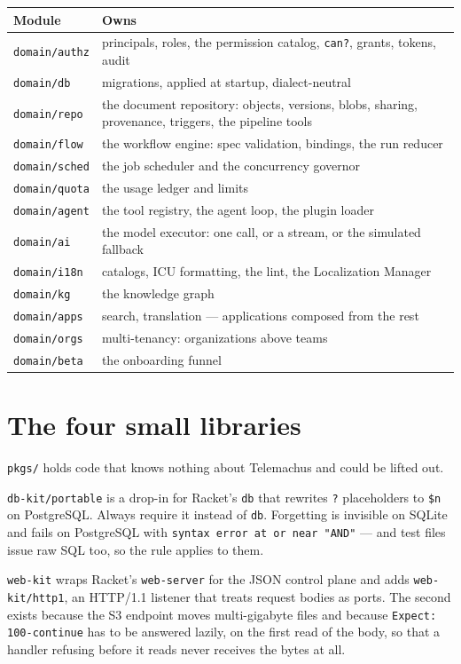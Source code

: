 \documentclass[11pt,a4paper]{report}
\begin{document}
\begin{longtable}{p{3.6cm}p{10.4cm}}
\toprule
Module & Owns \\
\midrule
\texttt{domain/authz} & principals, roles, the permission catalog, \texttt{can?}, grants, tokens, audit \\
\texttt{domain/db} & migrations, applied at startup, dialect-neutral \\
\texttt{domain/repo} & the document repository: objects, versions, blobs, sharing, provenance, triggers, the pipeline tools \\
\texttt{domain/flow} & the workflow engine: spec validation, bindings, the run reducer \\
\texttt{domain/sched} & the job scheduler and the concurrency governor \\
\texttt{domain/quota} & the usage ledger and limits \\
\texttt{domain/agent} & the tool registry, the agent loop, the plugin loader \\
\texttt{domain/ai} & the model executor: one call, or a stream, or the simulated fallback \\
\texttt{domain/i18n} & catalogs, ICU formatting, the lint, the Localization Manager \\
\texttt{domain/kg} & the knowledge graph \\
\texttt{domain/apps} & search, translation --- applications composed from the rest \\
\texttt{domain/orgs} & multi-tenancy: organizations above teams \\
\texttt{domain/beta} & the onboarding funnel \\
\bottomrule
\end{longtable}

\section{The four small libraries}

\texttt{pkgs/} holds code that knows nothing about Telemachus and could be lifted out.

\texttt{db-kit/portable} is a drop-in for Racket's \texttt{db} that rewrites \texttt{?} placeholders to \texttt{\$n} on PostgreSQL. Always require it instead of \texttt{db}. Forgetting is invisible on SQLite and fails on PostgreSQL with \texttt{syntax error at or near "AND"} --- and test files issue raw SQL too, so the rule applies to them.

\texttt{web-kit} wraps Racket's \texttt{web-server} for the JSON control plane and adds \texttt{web-kit/http1}, an HTTP/1.1 listener that treats request bodies as ports. The second exists because the S3 endpoint moves multi-gigabyte files and because \texttt{Expect: 100-continue} has to be answered lazily, on the first read of the body, so that a handler refusing before it reads never receives the bytes at all.
\end{document}
